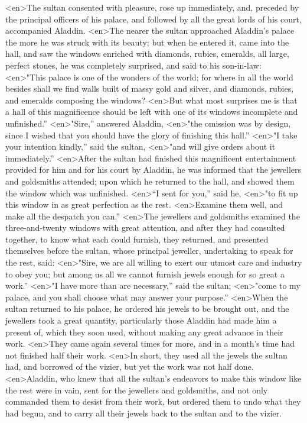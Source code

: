 <en>The sultan consented with pleasure, rose up immediately, and, preceded by the principal officers of his palace, and followed by all the great lords of his court, accompanied Aladdin.
<en>The nearer the sultan approached Aladdin’s palace the more he was struck with its beauty; but when he entered it, came into the hall, and saw the windows enriched with diamonds, rubies, emeralds, all large, perfect stones, he was completely surprised, and said to his son-in-law:
<en>"This palace is one of the wonders of the world; for where in all the world besides shall we find walls built of massy gold and silver, and diamonds, rubies, and emeralds composing the windows?
<en>But what most surprises me is that a hall of this magnificence should be left with one of its windows incomplete and unfinished.”
<en>"Sire,” answered Aladdin,
<en>"the omission was by design, since I wished that you should have the glory of finishing this hall.”
<en>"I take your intention kindly,” said the sultan,
<en>"and will give orders about it immediately.”
<en>After the sultan had finished this magnificent entertainment provided for him and for his court by Aladdin, he was informed that the jewellers and goldsmiths attended; upon which he returned to the hall, and showed them the window which was unfinished.
<en>“I sent for you,” said he,
<en>"to fit up this window in as great perfection as the rest.
<en>Examine them well, and make all the despatch you can.”
<en>The jewellers and goldsmiths examined the three-and-twenty windows with great attention, and after they had consulted together, to know what each could furnish, they returned, and presented themselves before the sultan, whose principal jeweller, undertaking to speak for the rest, said:
<en>"Sire, we are all willing to exert our utmost care and industry to obey you; but among us all we cannot furnish jewels enough for so great a work.”
<en>"I have more than are necessary,” said the sultan;
<en>"come to my palace, and you shall choose what may answer your purpose.”
<en>When the sultan returned to his palace, he ordered his jewels to be brought out, and the jewellers took a great quantity, particularly those Aladdin had made him a present of, which they soon used, without making any great advance in their work.
<en>They came again several times for more, and in a month’s time had not finished half their work.
<en>In short, they used all the jewels the sultan had, and borrowed of the vizier, but yet the work was not half done.
<en>Aladdin, who knew that all the sultan’s endeavors to make this window like the rest were in vain, sent for the jewellers and goldsmiths, and not only commanded them to desist from their work, but ordered them to undo what they had begun, and to carry all their jewels back to the sultan and to the vizier.
